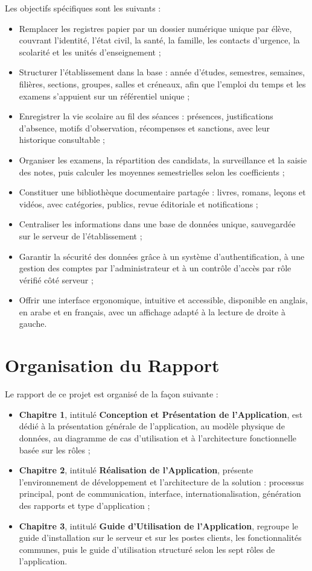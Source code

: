 Les objectifs spécifiques sont les suivants :
\begin{itemize}
    \item Remplacer les registres papier par un dossier numérique unique par élève, couvrant l'identité,
          l'état civil, la santé, la famille, les contacts d'urgence, la scolarité et les unités
          d'enseignement ;
    \item Structurer l'établissement dans la base : année d'études, semestres, semaines, filières,
          sections, groupes, salles et créneaux, afin que l'emploi du temps et les examens s'appuient sur
          un référentiel unique ;
    \item Enregistrer la vie scolaire au fil des séances : présences, justifications d'absence, motifs
          d'observation, récompenses et sanctions, avec leur historique consultable ;
    \item Organiser les examens, la répartition des candidats, la surveillance et la saisie des notes,
          puis calculer les moyennes semestrielles selon les coefficients ;
    \item Constituer une bibliothèque documentaire partagée : livres, romans, leçons et vidéos,
          avec catégories, publics, revue éditoriale et notifications ;
    \item Centraliser les informations dans une base de données unique, sauvegardée sur le serveur de
          l'établissement ;
    \item Garantir la sécurité des données grâce à un système d'authentification, à une gestion des
          comptes par l'administrateur et à un contrôle d'accès par rôle vérifié côté serveur ;
    \item Offrir une interface ergonomique, intuitive et accessible, disponible en anglais, en arabe et
          en français, avec un affichage adapté à la lecture de droite à gauche.
\end{itemize}

\section*{Organisation du Rapport}
Le rapport de ce projet est organisé de la façon suivante :
\begin{itemize}
    \item \textbf{Chapitre 1}, intitulé \textbf{Conception et Présentation de l'Application}, est dédié à
          la présentation générale de l'application, au modèle physique de données, au diagramme de cas
          d'utilisation et à l'architecture fonctionnelle basée sur les rôles ;
    \item \textbf{Chapitre 2}, intitulé \textbf{Réalisation de l'Application}, présente l'environnement de
          développement et l'architecture de la solution : processus principal, pont de communication,
          interface, internationalisation, génération des rapports et type d'application ;
    \item \textbf{Chapitre 3}, intitulé \textbf{Guide d'Utilisation de l'Application}, regroupe le guide
          d'installation sur le serveur et sur les postes clients, les fonctionnalités communes, puis le
          guide d'utilisation structuré selon les sept rôles de l'application.
\end{itemize}
